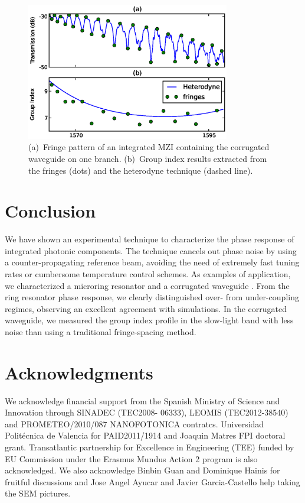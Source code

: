 \documentclass[journal]{IEEEtran}
\begin{document}
\begin{figure}[htb]
  \centering
  \includegraphics[width=3.5in]{gropIndexComparison_2}
  \caption{(a)~Fringe pattern of an integrated MZI containing the corrugated waveguide on one branch. (b)~Group index results extracted from the fringes (dots) and the heterodyne technique (dashed line).}
  \label{fig:groupIndex}
\end{figure}



\section{Conclusion}
We have shown an experimental technique to characterize the phase response of integrated photonic components.
The technique cancels out phase noise by using a counter-propagating reference beam, avoiding the need of extremely fast tuning rates or cumbersome temperature control schemes.
As examples of application, we characterized a microring resonator and a corrugated waveguide .
From the ring resonator phase response, we clearly distinguished over- from under-coupling regimes, observing an excellent agreement with simulations.
In the corrugated waveguide, we measured the group index profile in the slow-light band with less noise than using a traditional fringe-spacing method.



\section*{Acknowledgments}
We acknowledge financial support from the Spanish Ministry of Science and Innovation through  SINADEC (TEC2008- 06333), LEOMIS (TEC2012-38540) and PROMETEO/2010/087 NANOFOTONICA contratcs. Universidad Polit\'ecnica de Valencia for PAID2011/1914 and  Joaquin Matres FPI doctoral grant. Transatlantic partnership for Excellence in Engineering (TEE) funded by EU Commission under the Erasmus Mundus Action 2 program is also acknowledged.  We also acknowledge Binbin Guan and Dominique Hainis for fruitful discussions and Jose Angel Ayucar and Javier Garcia-Castello help taking the SEM pictures.
\end{document}
